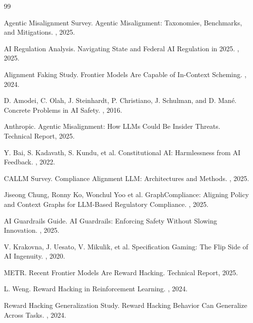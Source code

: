 \documentclass[11pt]{book}
\begin{document}
\begin{thebibliography}{99}

Agentic Misalignment Survey.
\newblock Agentic Misalignment: Taxonomies, Benchmarks, and Mitigations.
, 2025.

AI Regulation Analysis.
\newblock Navigating State and Federal AI Regulation in 2025.
, 2025.

Alignment Faking Study.
\newblock Frontier Models Are Capable of In-Context Scheming.
, 2024.

D. Amodei, C. Olah, J. Steinhardt, P. Christiano, J. Schulman, and D. Mané.
\newblock Concrete Problems in AI Safety.
, 2016.

Anthropic.
\newblock Agentic Misalignment: How LLMs Could Be Insider Threats.
\newblock Technical Report, 2025.

Y. Bai, S. Kadavath, S. Kundu, et al.
\newblock Constitutional AI: Harmlessness from AI Feedback.
, 2022.

CALLM Survey.
\newblock Compliance Alignment LLM: Architectures and Methods.
, 2025.

Jiseong Chung, Ronny Ko, Wonchul Yoo et al.
\newblock GraphCompliance: Aligning Policy and Context Graphs for LLM-Based Regulatory Compliance.
, 2025.

AI Guardrails Guide.
\newblock AI Guardrails: Enforcing Safety Without Slowing Innovation.
, 2025.

V. Krakovna, J. Uesato, V. Mikulik, et al.
\newblock Specification Gaming: The Flip Side of AI Ingenuity.
, 2020.

METR.
\newblock Recent Frontier Models Are Reward Hacking.
\newblock Technical Report, 2025.

L. Weng.
\newblock Reward Hacking in Reinforcement Learning.
, 2024.

Reward Hacking Generalization Study.
\newblock Reward Hacking Behavior Can Generalize Across Tasks.
, 2024.


\end{thebibliography}
\end{document}
